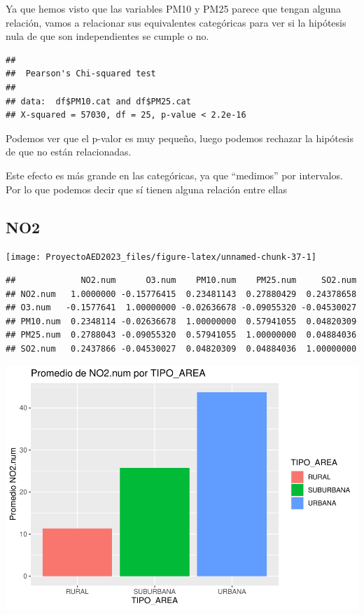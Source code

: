 \documentclass[notspecified,article,submit,moreauthors,pdftex]{Definitions/mdpi}
\newenvironment{Shaded}{\begin{snugshade}}{\end{snugshade}}
\newcommand{\AttributeTok}[1]{\textcolor[rgb]{0.13,0.29,0.53}{#1}}
\newcommand{\FunctionTok}[1]{\textcolor[rgb]{0.13,0.29,0.53}{\textbf{#1}}}
\newcommand{\NormalTok}[1]{#1}
\newcommand{\SpecialCharTok}[1]{\textcolor[rgb]{0.81,0.36,0.00}{\textbf{#1}}}
\begin{document}
Ya que hemos visto que las variables PM10 y PM25 parece que tengan
alguna relación, vamos a relacionar sus equivalentes categóricas para
ver si la hipótesis nula de que son independientes se cumple o no.

\begin{Shaded}
\end{Shaded}

\begin{verbatim}
## 
##  Pearson's Chi-squared test
## 
## data:  df$PM10.cat and df$PM25.cat
## X-squared = 57030, df = 25, p-value < 2.2e-16
\end{verbatim}

Podemos ver que el p-valor es muy pequeño, luego podemos rechazar la
hipótesis de que no están relacionadas.

Este efecto es más grande en las categóricas, ya que ``medimos'' por
intervalos. Por lo que podemos decir que sí tienen alguna relación entre
ellas

\hypertarget{no2}{%
\subsection{NO2}\label{no2}}

\begin{center}\texttt{[image: ProyectoAED2023\_files/figure-latex/unnamed-chunk-37-1]} \end{center}

\begin{verbatim}
##             NO2.num      O3.num    PM10.num    PM25.num     SO2.num
## NO2.num   1.0000000 -0.15776415  0.23481143  0.27880429  0.24378658
## O3.num   -0.1577641  1.00000000 -0.02636678 -0.09055320 -0.04530027
## PM10.num  0.2348114 -0.02636678  1.00000000  0.57941055  0.04820309
## PM25.num  0.2788043 -0.09055320  0.57941055  1.00000000  0.04884036
## SO2.num   0.2437866 -0.04530027  0.04820309  0.04884036  1.00000000
\end{verbatim}

\includegraphics{ProyectoAED2023_files/figure-latex/unnamed-chunk-39-1.pdf}
\end{document}
